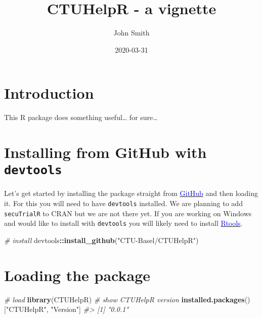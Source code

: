 \documentclass[]{article}
\title{CTUHelpR - a vignette}
\author{John Smith}
\date{2020-03-31}
\newenvironment{Shaded}{\begin{snugshade}}{\end{snugshade}}
\newcommand{\CommentTok}[1]{\textcolor[rgb]{0.56,0.35,0.01}{\textit{#1}}}
\newcommand{\KeywordTok}[1]{\textcolor[rgb]{0.13,0.29,0.53}{\textbf{#1}}}
\newcommand{\NormalTok}[1]{#1}
\newcommand{\OperatorTok}[1]{\textcolor[rgb]{0.81,0.36,0.00}{\textbf{#1}}}
\newcommand{\StringTok}[1]{\textcolor[rgb]{0.31,0.60,0.02}{#1}}
\begin{document}
\maketitle

{
\setcounter{tocdepth}{3}
\tableofcontents
}
\newpage

\hypertarget{introduction}{%
\section{Introduction}\label{introduction}}

This R package does something useful\ldots{} for sure\ldots{}

\hypertarget{installing-from-github-with-devtools}{%
\section{\texorpdfstring{Installing from GitHub with
\texttt{devtools}}{Installing from GitHub with devtools}}\label{installing-from-github-with-devtools}}

Let's get started by installing the package straight from
\href{https://github.com/SwissClinicalTrialOrganisation/secuTrialR}{\textcolor{blue}{GitHub}}
and then loading it. For this you will need to have \texttt{devtools}
installed. We are planning to add \texttt{secuTrialR} to CRAN but we are
not there yet. If you are working on Windows and would like to install
with \texttt{devtools} you will likely need to install
\href{https://cran.r-project.org/bin/windows/Rtools/}{\textcolor{blue}{Rtools}}.

\vspace{5pt}

\begin{Shaded}
\begin{Highlighting}[]
\CommentTok{# install}
\NormalTok{devtools}\OperatorTok{::}\KeywordTok{install_github}\NormalTok{(}\StringTok{"CTU-Basel/CTUHelpR"}\NormalTok{)}
\end{Highlighting}
\end{Shaded}

\hypertarget{loading-the-package}{%
\section{Loading the package}\label{loading-the-package}}

\begin{Shaded}
\begin{Highlighting}[]
\CommentTok{# load}
\KeywordTok{library}\NormalTok{(CTUHelpR)}
\CommentTok{# show CTUHelpR version}
\KeywordTok{installed.packages}\NormalTok{()[}\StringTok{"CTUHelpR"}\NormalTok{, }\StringTok{"Version"}\NormalTok{]}
\CommentTok{#> [1] "0.0.1"}
\end{Highlighting}
\end{Shaded}
\end{document}
